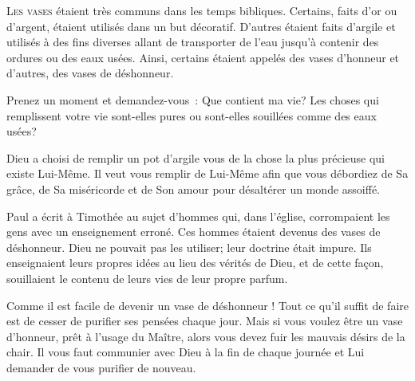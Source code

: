
\lettrine{L}{es vases} étaient très communs dans les temps bibliques.
 Certains, faits d'or ou d'argent, étaient utilisés dans un but décoratif.
 D'autres étaient faits d'argile et utilisés à des fins diverses
 allant de transporter de l'eau jusqu'à contenir des ordures
 ou des eaux usées. Ainsi, certains étaient appelés des vases d'honneur
 et d'autres, des vases de déshonneur.

Prenez un moment et demandez-vous~: 
 \og Que contient ma vie? \fg {}
 Les choses qui remplissent votre vie sont-elles
 pures ou sont-elles souillées comme des eaux usées? 


Dieu a choisi de remplir un pot d'argile \ocadr vous \fcadr{}
 de la chose la plus précieuse qui existe \ocadr Lui-Même.
 Il veut vous remplir de Lui-Même afin que vous débordiez de Sa grâce,
 de Sa miséricorde et de Son amour pour désaltérer un monde assoiffé.

Paul a écrit à Timothée au sujet d'hommes qui, dans l'église,
 corrompaient les gens avec un enseignement erroné.
 Ces hommes étaient devenus des vases de déshonneur.
 Dieu ne pouvait pas les utiliser; leur doctrine était impure.
 Ils enseignaient leurs propres idées au lieu des vérités de Dieu,
 et de cette façon, souillaient le contenu de leurs vies
 de leur propre parfum. 

Comme il est facile de devenir un vase de déshonneur !
 Tout ce qu'il suffit de faire est de cesser de purifier ses pensées
 chaque jour. Mais si vous voulez être un vase d'honneur,
 prêt à l'usage du Maître, alors vous devez fuir les mauvais désirs
 de la chair. Il vous faut communier avec Dieu à la fin de chaque journée
 et Lui demander de vous purifier de nouveau. 

\dvrule







